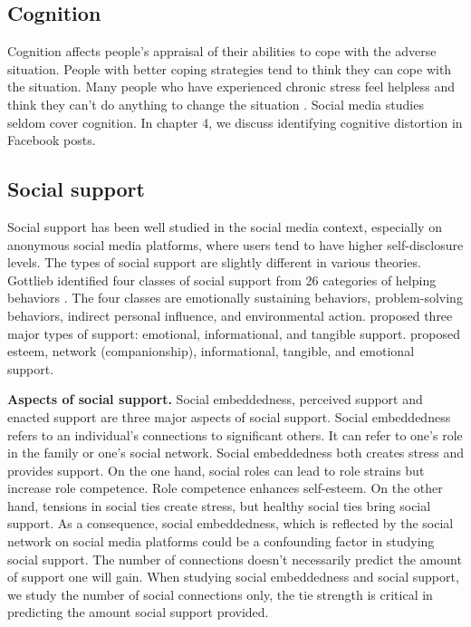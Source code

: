 \subsection{Cognition}
Cognition affects people's appraisal of their abilities to cope with the adverse situation. People with better coping strategies tend to think they can cope with the situation. Many people who have experienced chronic stress feel helpless and think they can't do anything to change the situation \cite{rutter1985resilience}. Social media studies seldom cover cognition. In chapter 4, we discuss identifying cognitive distortion in Facebook posts.

\subsection{Social support}
Social support has been well studied in the social media context, especially on anonymous social media platforms, where users tend to have higher self-disclosure levels. The types of social support are slightly different in various theories. Gottlieb identified four classes of social support from 26 categories of helping behaviors \cite{gottlieb1978development}. The four classes are emotionally sustaining behaviors, problem-solving behaviors, indirect personal influence, and environmental action.  \citet{house1985social} proposed three major types of support: emotional, informational, and tangible support. \citet{cutrona1990interpersonal} proposed esteem, network (companionship), informational, tangible, and emotional support.

\textbf{Aspects of social support.} Social embeddedness, perceived support and enacted support are three major aspects of social support. Social embeddedness refers to an individual's connections to significant others. It can refer to one's role in the family or one's social network. Social embeddedness both creates stress and provides support. On the one hand, social roles can lead to role strains but increase role competence. Role competence enhances self-esteem. On the other hand, tensions in social ties create stress, but healthy social ties bring social support. As a consequence, social embeddedness, which is reflected by the social network on social media platforms could be a confounding factor in studying social support. The number of connections doesn't necessarily predict the amount of support one will gain. When studying social embeddedness and social support, we study the number of social connections only, the tie strength is critical in predicting the amount social support provided.

